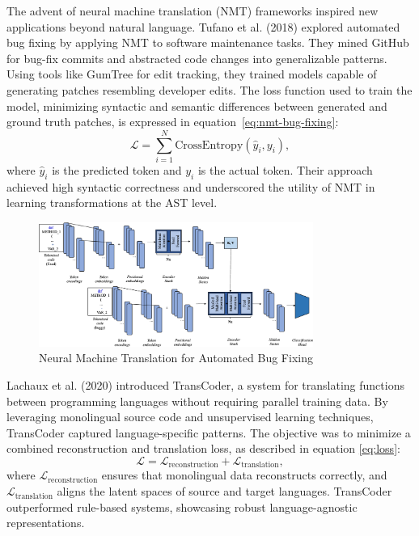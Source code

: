 \documentclass{dhbenelux}
\begin{document}
The advent of neural machine translation (NMT) frameworks inspired new applications beyond natural language. Tufano et al. (2018) explored automated bug fixing by applying NMT to software maintenance tasks. They mined GitHub for bug-fix commits and abstracted code changes into generalizable patterns. Using tools like GumTree for edit tracking, they trained models capable of generating patches resembling developer edits. The loss function used to train the model, minimizing syntactic and semantic differences between generated and ground truth patches, is expressed in equation~\ref{eq:nmt-bug-fixing}:
\begin{equation}
\mathcal{L} = \sum_{i=1}^N \text{CrossEntropy}(\hat{y}_i, y_i),
\label{eq:nmt-bug-fixing}
\end{equation}
where \( \hat{y}_i \) is the predicted token and \( y_i \) is the actual token. Their approach achieved high syntactic correctness and underscored the utility of NMT in learning transformations at the AST level.
\begin{figure}[h]
    \centering
    \includegraphics[width=0.8\textwidth]{Images/3.png} %
    \caption{Neural Machine Translation for Automated Bug Fixing}
    \label{fig:nmt-bug-fixing}
\end{figure}

Lachaux et al. (2020) introduced TransCoder, a system for translating functions between programming languages without requiring parallel training data. By leveraging monolingual source code and unsupervised learning techniques, TransCoder captured language-specific patterns. The objective was to minimize a combined reconstruction and translation loss, as described in equation \ref{eq:loss}:
\begin{equation}
\mathcal{L} = \mathcal{L}_{\text{reconstruction}} + \mathcal{L}_{\text{translation}},
\label{eq:loss}
\end{equation}
where \( \mathcal{L}_{\text{reconstruction}} \) ensures that monolingual data reconstructs correctly, and \( \mathcal{L}_{\text{translation}} \) aligns the latent spaces of source and target languages. TransCoder outperformed rule-based systems, showcasing robust language-agnostic representations.
\end{document}

